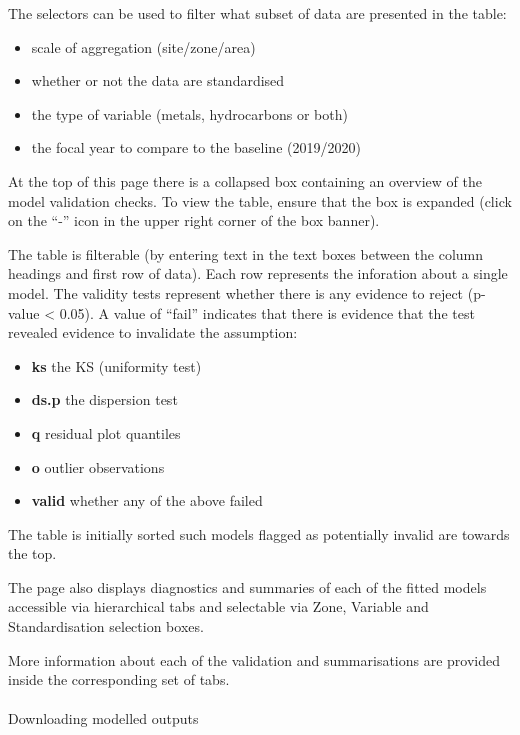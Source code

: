 \documentclass[
  8pt,
  a4paper]{article}
\makeatletter
\let\oldparagraph\paragraph
\renewcommand{\paragraph}{
    \@ifstar
      \xxxParagraphStar
      \xxxParagraphNoStar
  }
\newcommand{\xxxParagraphStar}[1]{\oldparagraph*{#1}\mbox{}}
\newcommand{\xxxParagraphNoStar}[1]{\oldparagraph{#1}\mbox{}}
\providecommand{\tightlist}{%
  \setlength{\itemsep}{0pt}\setlength{\parskip}{0pt}}
\makeatother
\begin{document}
The selectors can be used to filter what subset of data are presented in
the table:

\begin{itemize}
\tightlist
\item
  scale of aggregation (site/zone/area)
\item
  whether or not the data are standardised
\item
  the type of variable (metals, hydrocarbons or both)
\item
  the focal year to compare to the baseline (2019/2020)
\end{itemize}

At the top of this page there is a collapsed box containing an overview
of the model validation checks. To view the table, ensure that the box
is expanded (click on the ``-'' icon in the upper right corner of the
box banner).

The table is filterable (by entering text in the text boxes between the
column headings and first row of data). Each row represents the
inforation about a single model. The validity tests represent whether
there is any evidence to reject (p-value \textless{} 0.05). A value of
``fail'' indicates that there is evidence that the test revealed
evidence to invalidate the assumption:

\begin{itemize}
\tightlist
\item
  \textbf{ks} the KS (uniformity test)
\item
  \textbf{ds.p} the dispersion test
\item
  \textbf{q} residual plot quantiles
\item
  \textbf{o} outlier observations
\item
  \textbf{valid} whether any of the above failed
\end{itemize}

The table is initially sorted such models flagged as potentially invalid
are towards the top.

The page also displays diagnostics and summaries of each of the fitted
models accessible via hierarchical tabs and selectable via Zone,
Variable and Standardisation selection boxes.

More information about each of the validation and summarisations are
provided inside the corresponding set of tabs.

\paragraph{Downloading modelled
outputs}\label{downloading-modelled-outputs}
\end{document}
